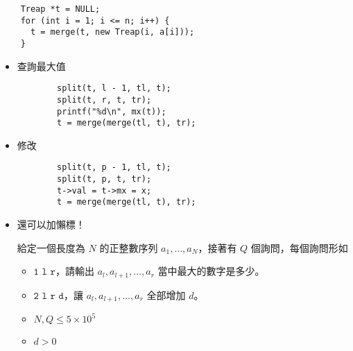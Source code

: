 \documentclass[standalone]{beamer}
\begin{document}
\begin{frame}[fragile]{}
  \begin{verbatim}
    Treap *t = NULL;
    for (int i = 1; i <= n; i++) {
      t = merge(t, new Treap(i, a[i]));
    }
  \end{verbatim}
\end{frame}

\begin{frame}[fragile]{}
  \begin{itemize}
    \item 查詢最大值
      \begin{verbatim}
        split(t, l - 1, tl, t);
        split(t, r, t, tr);
        printf("%d\n", mx(t));
        t = merge(merge(tl, t), tr);
      \end{verbatim}
    \item 修改
      \begin{verbatim}
        split(t, p - 1, tl, t);
        split(t, p, t, tr);
        t->val = t->mx = x;
        t = merge(merge(tl, t), tr);
      \end{verbatim}
  \end{itemize}
\end{frame}

\begin{frame}[fragile]{}
  \begin{itemize}
    \item 還可以加懶標！
    \begin{problem}
      給定一個長度為 \(N\) 的正整數序列 \(a_1, \dots, a_N\)，接著有 \(Q\) 個詢問，每個詢問形如
      \begin{itemize}
          \item
              \(\texttt{1 l r}\)，請輸出 \(a_l, a_{l+1}, \dots, a_r\) 當中最大的數字是多少。
          \item
              \(\texttt{2 l r d}\)，讓 \(a_l, a_{l+1}, \dots, a_r\) 全部增加 \(d\)。
      \end{itemize}

      \begin{itemize}
          \item \(N, Q \leq 5 \times 10^5\)
          \item \(d > 0\)
      \end{itemize}
    \end{problem}
  \end{itemize}
\end{frame}
\end{document}
